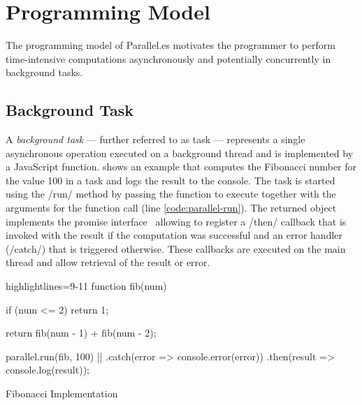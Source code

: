 \section{Programming Model}\label{sec:programming-model}
The programming model of Parallel.es motivates the programmer to perform time-intensive computations asynchronously and potentially concurrently in background tasks. 

\subsection{Background Task}
A \textit{background task} --- further referred to as task --- represents a single asynchronous operation executed on a background thread and is implemented by a JavaScript function.  shows an example that computes the Fibonacci number for the value 100 in a task and logs the result to the console. The task is started using the \javascriptinline/run/ method by passing the function to execute together with the arguments for the function call (line \ref{code:parallel-run}). The returned object implements the promise interface~\cite[Section 18.3.18]{ecmaScript2015} allowing to register a \javascriptinline/then/ callback that is invoked with the result if the computation was successful and an error handler (\javascriptinline/catch/) that is triggered otherwise. These callbacks are executed on the main thread and allow retrieval of the result or error. 


\begin{listing}
	\begin{javascriptcode*}{highlightlines={9-11}}
function fib(num) {
	if (num <= 2) {
    	return 1;
	}

	return fib(num - 1) + fib(num - 2);
}
        
parallel.run(fib, 100) |$\label{code:parallel-run}$|
	.catch(error => console.error(error))
	.then(result => console.log(result));	
	\end{javascriptcode*}

	\caption{Fibonacci Implementation}
	\label{fig:fibonacci-implementation}
\end{listing}

